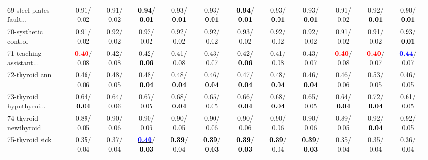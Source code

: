 \begin{table}[h]
\begin{center}
{\begin{tabular}{lc|c|c|c|c|c|c|c|c|c|c}
69-steel plates fault... &   0.91/  0.02 &   0.91/  0.02 & \textcolor{black}{\textbf{  0.94}}/\textcolor{black}{\textbf{  0.01}} &   0.93/\textcolor{black}{\textbf{  0.01}} &   0.93/\textcolor{black}{\textbf{  0.01}} & \textcolor{black}{\textbf{  0.94}}/\textcolor{black}{\textbf{  0.01}} &   0.93/\textcolor{black}{\textbf{  0.01}} &   0.93/\textcolor{black}{\textbf{  0.01}} &   0.91/  0.02 &   0.92/\textcolor{black}{\textbf{  0.01}} &   0.90/\textcolor{black}{\textbf{  0.01}} \\
70-systhetic control &   0.91/  0.02 &   0.92/  0.02 &   0.93/  0.02 &   0.92/  0.02 &   0.92/  0.02 &   0.93/  0.02 &   0.92/  0.02 &   0.92/  0.02 &   0.91/  0.02 &   0.91/  0.02 &   0.93/\textcolor{black}{\textbf{  0.01}} \\
71-teaching assistant... & \textcolor{red}{\textbf{  0.40}}/  0.08 &   0.42/  0.08 &   0.42/\textcolor{black}{\textbf{  0.06}} &   0.41/  0.08 &   0.43/  0.07 &   0.42/\textcolor{black}{\textbf{  0.06}} &   0.41/  0.08 &   0.43/  0.07 & \textcolor{red}{\textbf{  0.40}}/  0.08 & \textcolor{red}{\textbf{  0.40}}/  0.07 & \textcolor{blue}{\textbf{  0.44}}/  0.07 \\ \hline
72-thyroid ann &   0.46/  0.06 &   0.48/  0.05 &   0.48/\textcolor{black}{\textbf{  0.04}} &   0.48/\textcolor{black}{\textbf{  0.04}} &   0.46/\textcolor{black}{\textbf{  0.04}} &   0.47/\textcolor{black}{\textbf{  0.04}} &   0.48/\textcolor{black}{\textbf{  0.04}} &   0.46/\textcolor{black}{\textbf{  0.04}} &   0.46/  0.06 &   0.53/  0.05 &   0.46/  0.05 \\
73-thyroid hypothyroi... &   0.64/\textcolor{black}{\textbf{  0.04}} &   0.64/  0.06 &   0.67/  0.05 &   0.68/\textcolor{black}{\textbf{  0.04}} &   0.65/  0.05 &   0.66/\textcolor{black}{\textbf{  0.04}} &   0.68/\textcolor{black}{\textbf{  0.04}} &   0.65/  0.05 &   0.64/\textcolor{black}{\textbf{  0.04}} &   0.72/\textcolor{black}{\textbf{  0.04}} &   0.61/  0.05 \\
74-thyroid newthyroid &   0.89/  0.05 &   0.90/  0.06 &   0.90/  0.06 &   0.90/  0.05 &   0.90/  0.06 &   0.90/  0.06 &   0.90/  0.06 &   0.90/  0.06 &   0.89/  0.05 &   0.92/\textcolor{black}{\textbf{  0.04}} &   0.92/  0.05 \\
75-thyroid sick &   0.35/  0.04 &   0.37/  0.04 & \underline{\textcolor{blue}{\textbf{  0.40}}}/\textcolor{black}{\textbf{  0.03}} & \textcolor{black}{\textbf{  0.39}}/  0.04 & \textcolor{black}{\textbf{  0.39}}/\textcolor{black}{\textbf{  0.03}} & \textcolor{black}{\textbf{  0.39}}/\textcolor{black}{\textbf{  0.03}} & \textcolor{black}{\textbf{  0.39}}/  0.04 & \textcolor{black}{\textbf{  0.39}}/\textcolor{black}{\textbf{  0.03}} &   0.35/  0.04 &   0.35/  0.04 &   0.36/  0.04 \\

\end{tabular}}
\end{center}
\end{table}
